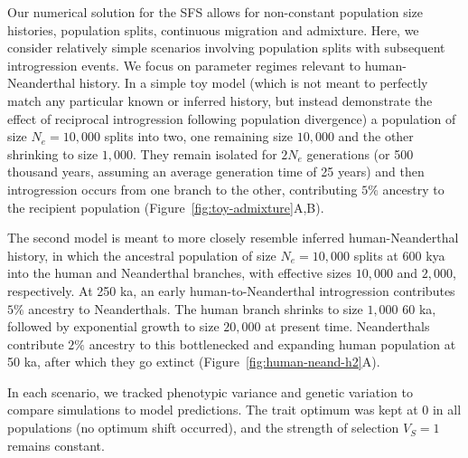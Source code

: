 \documentclass{article}
\begin{document}
Our numerical solution for the SFS allows for non-constant population size
histories, population splits, continuous migration and admixture. Here, we
consider relatively simple scenarios involving population splits with
subsequent introgression events. We focus on parameter regimes relevant to
human-Neanderthal history. In a simple toy model (which is not meant to
perfectly match any particular known or inferred history, but instead
demonstrate the effect of reciprocal introgression following population
divergence) a population of size $N_e=10{,}000$ splits into two, one remaining
size $10{,}000$ and the other shrinking to size $1{,}000$. They remain isolated
for $2N_e$ generations (or 500 thousand years, assuming an average generation
time of 25 years) and then introgression occurs from one branch to the other,
contributing $5\%$ ancestry to the recipient population
(Figure~\ref{fig:toy-admixture}A,B).

The second model is meant to more closely resemble inferred human-Neanderthal
history, in which the ancestral population of size $N_e=10{,}000$ splits at 600
kya into the human and Neanderthal branches, with effective sizes $10{,}000$
and $2{,}000$, respectively. At 250 ka, an early human-to-Neanderthal
introgression contributes $5\%$ ancestry to Neanderthals. The human branch
shrinks to size $1{,}000$ 60 ka, followed by exponential growth to size
$20,000$ at present time. Neanderthals contribute $2\%$ ancestry to this
bottlenecked and expanding human population at 50 ka, after which they go
extinct (Figure~\ref{fig:human-neand-h2}A).

In each scenario, we tracked phenotypic variance and genetic variation to
compare simulations to model predictions. The trait optimum was kept at $0$ in
all populations (no optimum shift occurred), and the strength of selection
$V_S=1$ remains constant.
\end{document}
